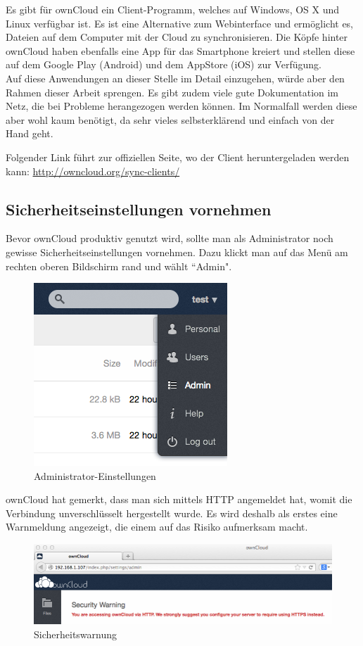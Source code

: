 Es gibt für ownCloud ein Client-Programm, welches auf Windows, OS X und Linux verfügbar ist. Es ist eine Alternative zum Webinterface und ermöglicht es, Dateien auf dem Computer mit der Cloud zu synchronisieren. Die Köpfe hinter ownCloud haben ebenfalls eine App für das Smartphone kreiert und stellen diese auf dem Google Play (Android) und dem AppStore (iOS) zur Verfügung.
\\
Auf diese Anwendungen an dieser Stelle im Detail einzugehen, würde aber den Rahmen dieser Arbeit sprengen. Es gibt zudem viele gute Dokumentation im Netz, die bei Probleme herangezogen werden können. Im Normalfall werden diese aber wohl kaum benötigt, da sehr vieles selbsterklärend und einfach von der Hand geht.

Folgender Link führt zur offiziellen Seite, wo der Client heruntergeladen werden kann: \url{http://owncloud.org/sync-clients/} 

\subsection{Sicherheitseinstellungen vornehmen}
Bevor ownCloud produktiv genutzt wird, sollte man als Administrator noch gewisse Sicherheitseinstellungen vornehmen. Dazu klickt man auf das Menü am rechten oberen Bildschirm rand und wählt ``Admin".

\begin{figure}[h]
\centering
\includegraphics[scale=0.5]{images/admin_settings}
\caption{Administrator-Einstellungen}
\end{figure}

ownCloud hat gemerkt, dass man sich mittels HTTP angemeldet hat, womit die Verbindung unverschlüsselt hergestellt wurde. Es wird deshalb als erstes eine Warnmeldung angezeigt, die einem auf das Risiko aufmerksam macht. 

\begin{figure}[h]
\centering
\includegraphics[scale=0.6]{images/security_warning}
\caption{Sicherheitswarnung}
\end{figure}

